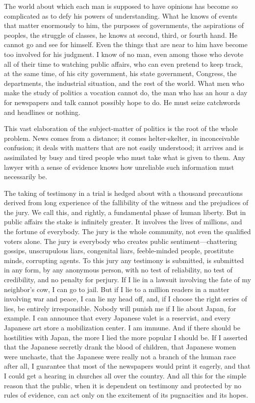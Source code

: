 \documentclass[openany,nobib,nohyper]{tufte-book}
\begin{document}
The world about which each man is supposed to have opinions has become
so complicated as to defy his powers of understanding. What he knows of
events that matter enormously to him, the purposes of governments, the
aspirations of peoples, the struggle of classes, he knows at second,
third, or fourth hand. He cannot go and see for himself. Even the things
that are near to him have become too involved for his judgment. I know
of no man, even among those who devote all of their time to watching
public affairs, who can even pretend to keep track, at the same time, of
his city government, his state government, Congress, the departments,
the industrial situation, and the rest of the world. What men who make
the study of politics a vocation cannot do, the man who has an hour a
day for newspapers and talk cannot possibly hope to do. He must seize
catchwords and headlines or nothing.

\clearpage
This vast elaboration of the subject-matter of politics is the root of
the whole problem. News comes from a distance; it comes helter-skelter,
in inconceivable confusion; it deals with matters that are not easily
understood; it arrives and is assimilated by busy and tired people who
must take what is given to them. Any lawyer with a sense of evidence
knows how unreliable such information must necessarily be.

The taking of testimony in a trial is hedged about with a thousand
precautions derived from long experience of the fallibility of the
witness and the prejudices of the jury. We call this, and rightly, a
fundamental phase of human liberty. But in public affairs the stake is
infinitely greater. It involves the lives of millions, and the fortune
of everybody. The jury is the whole community, not even the qualified
voters alone. The jury is everybody who creates public
sentiment---chattering gossips, unscrupulous liars, congenital liars,
feeble-minded people, prostitute minds, corrupting agents. To this jury
any testimony is submitted, is submitted in any form, by any anonymous
person, with no test of reliability, no test of credibility, and no
penalty for perjury. If I lie in a lawsuit involving the fate of my
neighbor's cow, I can go to jail. But if I lie to a million readers in a
matter involving war and peace, I can lie my head off, and, if I choose
the right series of lies, be entirely irresponsible. Nobody will punish
me if I lie about Japan, for example. I can announce that every Japanese
valet is a reservist, and every Japanese art store a mobilization
center. I am immune. And if there should be hostilities with Japan, the
more I lied the more popular I should be. If I asserted that the
Japanese secretly drank the blood of children, that Japanese women were
unchaste, that the Japanese were really not a branch of the human race
after all, I guarantee that most of the newspapers would print it
eagerly, and that I could get a hearing in churches all over the
country. And all this for the simple reason that the public, when it is
dependent on testimony and protected by no rules of evidence, can act
only on the excitement of its pugnacities and its hopes.
\end{document}
